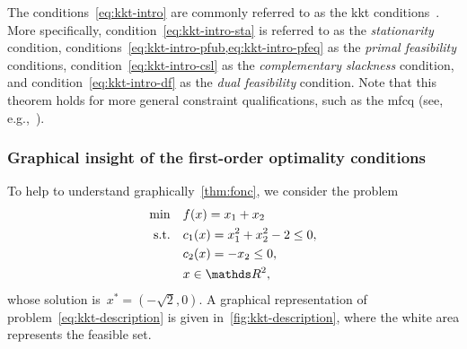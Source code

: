 The conditions~\cref{eq:kkt-intro} are commonly referred to as the \gls{kkt} conditions~\cite{Karush_1939,Kuhn_Tucker_1951}.
More specifically, condition~\cref{eq:kkt-intro-sta} is referred to as the \emph{stationarity} condition, conditions~\cref{eq:kkt-intro-pfub,eq:kkt-intro-pfeq} as the \emph{primal feasibility} conditions, condition~\cref{eq:kkt-intro-csl} as the \emph{complementary slackness} condition, and condition~\cref{eq:kkt-intro-df} as the \emph{dual feasibility} condition.
Note that this theorem holds for more general constraint qualifications, such as the \gls{mfcq} (see, e.g.,~\cite[p.~339]{Nocedal_Wright_2006}).

\subsubsection{Graphical insight of the first-order optimality conditions}

To help to understand graphically~\cref{thm:fonc}, we consider the problem
\begin{subequations}
    \label{eq:kkt-description}
    \begin{align}
        \min        & \quad \obj(x) = x_1 + x_2\\
        \text{s.t.} & \quad \con{1}(x) = x_1^2 + x_2^2 - 2 \le 0, \label{eq:kkt-description-c1}\\
                    & \quad \con{2}(x) = -x_2 \le 0, \label{eq:kkt-description-c2}\\
                    & \quad x \in \R^2, \nonumber
    \end{align}
\end{subequations}
whose solution is~$x^{\ast} = (-\sqrt{2}, 0)$.
A graphical representation of problem~\cref{eq:kkt-description} is given in~\cref{fig:kkt-description}, where the white area represents the feasible set.

